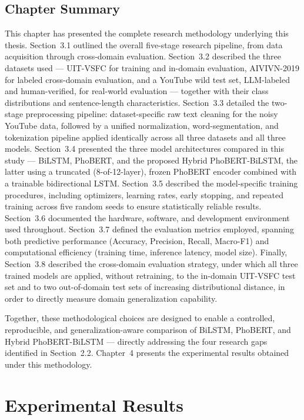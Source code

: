 \documentclass[12pt]{report} %
\begin{document}
\section{Chapter Summary}

This chapter has presented the complete research methodology underlying this thesis. Section~3.1 outlined the overall five-stage research pipeline, from data acquisition through cross-domain evaluation. Section~3.2 described the three datasets used --- UIT-VSFC for training and in-domain evaluation, AIVIVN-2019 for labeled cross-domain evaluation, and a YouTube wild test set, LLM-labeled and human-verified, for real-world evaluation --- together with their class distributions and sentence-length characteristics. Section~3.3 detailed the two-stage preprocessing pipeline: dataset-specific raw text cleaning for the noisy YouTube data, followed by a unified normalization, word-segmentation, and tokenization pipeline applied identically across all three datasets and all three models. Section~3.4 presented the three model architectures compared in this study --- BiLSTM, PhoBERT, and the proposed Hybrid PhoBERT-BiLSTM, the latter using a truncated (8-of-12-layer), frozen PhoBERT encoder combined with a trainable bidirectional LSTM. Section~3.5 described the model-specific training procedures, including optimizers, learning rates, early stopping, and repeated training across five random seeds to ensure statistically reliable results. Section~3.6 documented the hardware, software, and development environment used throughout. Section~3.7 defined the evaluation metrics employed, spanning both predictive performance (Accuracy, Precision, Recall, Macro-F1) and computational efficiency (training time, inference latency, model size). Finally, Section~3.8 described the cross-domain evaluation strategy, under which all three trained models are applied, without retraining, to the in-domain UIT-VSFC test set and to two out-of-domain test sets of increasing distributional distance, in order to directly measure domain generalization capability.

Together, these methodological choices are designed to enable a controlled, reproducible, and generalization-aware comparison of BiLSTM, PhoBERT, and Hybrid PhoBERT-BiLSTM --- directly addressing the four research gaps identified in Section~2.2. Chapter~4 presents the experimental results obtained under this methodology.

\chapter{Experimental Results}
\end{document}
